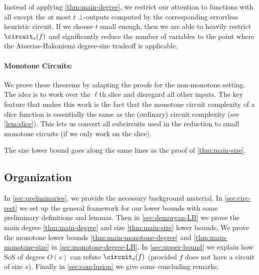 Instead of applying \cref{thm:main-degree}, we restrict our attention
to functions with all except the at most $t$ $\bot$-outputs computed
by the corresponding errorrless heuristic circuit. If we choose $t$
small enough, then we are able to heavily restrict $\circuit_s(f)$ and
significantly reduce the number of variables to the point where the
Atserias-Hakoniemi degree-size tradeoff is applicable.

\paragraph{Monotone Circuits:}

We prove these theorems by adapting the proofs for the non-monotone setting.
The idea is to work over the $\ell$th slice and disregard all other
inputs. The key feature that makes this work is the fact that the
monotone circuit complexity of a slice function is essentially the same as
the (ordinary) circuit complexity (see \cref{lem:slice}).  This lets us
convert all subcircuits used in the reduction to small monotone circuits (if
we only work on the slice).

The size lower bound goes along the same lines as the proof of
\cref{thm:main-size}. 

\subsection{Organization}

In \cref{sec:preliminaries}, we provide the necessary background
material. In \cref{sec:circ-rest} we set up the general framework for our
lower bounds with some preliminary definitions and lemmas.
Then in \cref{sec:demorgan-LB} we prove the main degree \cref{thm:main-degree} and
size \cref{thm:main-size} lower bounds. We
prove the monotone lower bounds \cref{thm:main-monotone-degree} and
\cref{thm:main-monotone-size} in \cref{sec:monotone-degree-LB}.  In
\cref{sec:upper-bound} we explain how SoS of degree $O(s)$ can refute
$\circuit_s(f)$ (provided $f$ does not have a circuit of size $s$).
Finally in \cref{sec:conclusion} we give some concluding remarks.
